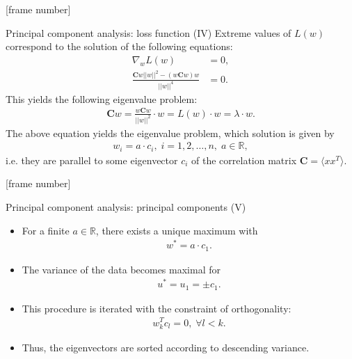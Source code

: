 \documentclass[aspectratio=169,t]{beamer}
\begin{document}
  {
    [frame number]
    \begin{frame}{Principal component analysis: loss function (IV)}
    Extreme values of $L(w)$ correspond to the solution of the following equations:
    \begin{align}
    \nabla_w L(w) &= 0,\\
    \frac{\mathbf{C}w \vert\vert w \vert\vert^2 - (w \mathbf{C} w)w}{\vert\vert w \vert\vert^4} &= 0.
    \end{align}
    This yields the following eigenvalue problem:
    \begin{align}
      \mathbf{C}w = \frac{w\mathbf{C}w}{\vert\vert w \vert\vert^2} \cdot w = L(w) \cdot w = \lambda \cdot w.
    \end{align}
    The above equation yields the eigenvalue problem, which solution is given by
    \begin{align}
    w_i = a \cdot c_i, \; i=1,2,\ldots,n, \; a \in \mathbb{R},
    \end{align}
    i.e. they are parallel to some eigenvector $c_i$ of the correlation matrix $\mathbf{C} = \langle xx^T \rangle$.
    \end{frame}
  }

  {
    [frame number]
    \begin{frame}{Principal component analysis: principal components (V)}
    \begin{itemize}
      \item For a finite $a \in \mathbb{R}$, there exists a unique maximum with
      \begin{align}
      w^* = a \cdot c_1.
      \end{align}
      \item The variance of the data becomes maximal for
      \begin{align}
      u^* = u_1 = \pm c_1.
      \end{align}
      \item This procedure is iterated with the constraint of orthogonality:
      \begin{align}
      w_k^Tc_l = 0, \; \forall l < k.
      \end{align}
      \item Thus, the eigenvectors are sorted according to descending variance.
    \end{itemize}
    \end{frame}
  }
\end{document}
